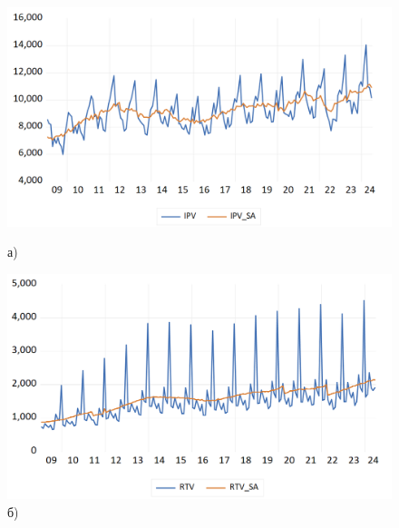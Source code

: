 \documentclass[a4paper, 14pt]{extreport}
\numberwithin{equation}{subsection}
\numberwithin{equation}{section}
\begin{document}
	\begin{figure}[h]
		\centering
		\begin{minipage}{0.5\textwidth}
			\centering
		\includegraphics[scale=0.25]{images/img02}
			\caption*{а)}
		\end{minipage}%
		\begin{minipage}{0.5\textwidth}
			\centering
		\includegraphics[scale=0.25]{images/img03}
			\caption*{б)}
		\end{minipage}%
		

\end{figure}
\end{document}
